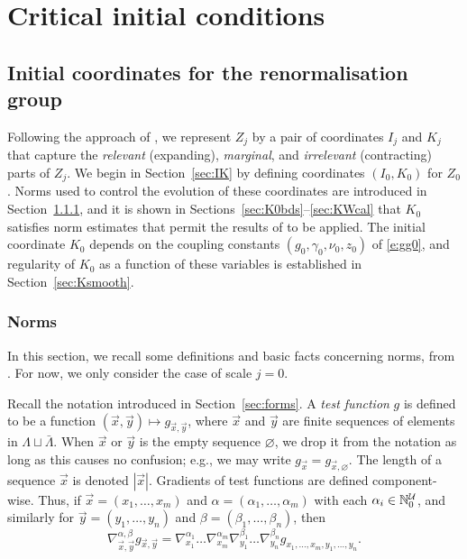 \chapter{Critical initial conditions}


\section{Initial coordinates for the renormalisation group}
\label{sec:K0bd}

Following the approach of \cite{BBS-saw4-log},
we represent $Z_j$
by a pair of coordinates $I_j$ and $K_j$ that capture the \emph{relevant} (expanding),
\emph{marginal},
and \emph{irrelevant} (contracting) parts of $Z_j$.
We begin in Section~\ref{sec:IK} by defining coordinates $(I_0, K_0)$ for $Z_0$.
Norms used to control the evolution of these coordinates are introduced
in Section~\ref{sec:norms}, and it is shown in
Sections~\ref{sec:K0bds}--\ref{sec:KWcal} that $K_0$ satisfies norm estimates
that permit the results of \cite{BS-rg-step,BBS-rg-flow} to be applied.
The initial coordinate $K_0$
depends on the coupling constants $(g_0, \gamma_0, \nu_0, z_0)$
of \eqref{e:gg0}, and regularity of $K_0$ as a function of these variables
is established in Section~\ref{sec:Ksmooth}.


\subsection{Norms}
\label{sec:norms}

In this section, we recall some definitions and basic facts concerning norms,
from \cite{BS-rg-norm}.
For now, we only consider the case of scale $j = 0$.

Recall the notation introduced in Section~\ref{sec:forms}.
A \emph{test function} $g$ is defined to be a function $(\vec x, \vec y) \mapsto g_{\vec x,\vec y}$,
where $\vec x$ and $\vec y$ are finite sequences of elements in $\Lambda \sqcup \bar\Lambda$.
When $\vec x$ or $\vec y$ is the empty sequence $\varnothing$,
we drop it from the notation as long as this causes no confusion;
e.g., we may write $g_{\vec x} = g_{\vec x,\varnothing}$.
The length of a sequence $\vec x$ is denoted $|\vec x|$.
Gradients of test functions are defined component-wise.
Thus, if $\vec x = (x_1, \ldots, x_m)$
and $\alpha = (\alpha_1, \ldots, \alpha_m)$
with each $\alpha_i \in {\mathbb N}_0^{\mathcal{U}}$, and similarly for $\vec y=(y_1,\ldots,y_n)$ and
$\beta=(\beta_1,\ldots,\beta_n)$,
then
\begin{equation}
\nabla^{\alpha,\beta}_{\vec x,\vec y} g_{\vec x,\vec y}
  =
\nabla^{\alpha_1}_{x_1} \ldots \nabla^{\alpha_m}_{x_m}
\nabla^{\beta_1}_{y_1} \ldots \nabla^{\beta_n}_{y_n}  g_{x_1,\ldots,x_m,y_1,\ldots,y_n}.
\end{equation}

